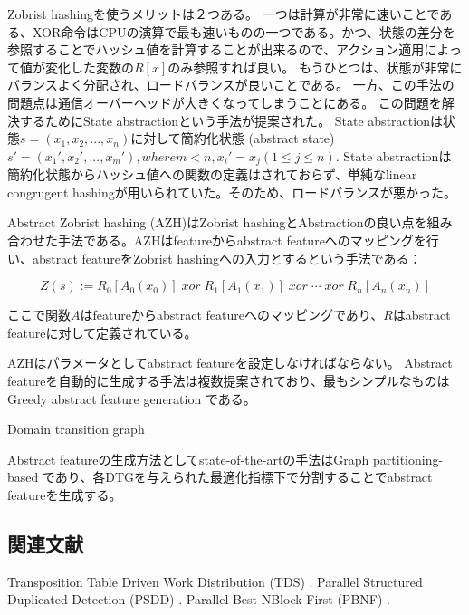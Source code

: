 \documentclass[10pt]{book}
\begin{document}
Zobrist hashingを使うメリットは２つある。
一つは計算が非常に速いことである、XOR命令はCPUの演算で最も速いものの一つである。かつ、状態の差分を参照することでハッシュ値を計算することが出来るので、アクション適用によって値が変化した変数の$R[x]$のみ参照すれば良い。
もうひとつは、状態が非常にバランスよく分配され、ロードバランスが良いことである。
一方、この手法の問題点は通信オーバーヘッドが大きくなってしまうことにある。
この問題を解決するためにState abstractionという手法が提案された\cite{burnslrz10}。
State abstractionは状態$s = (x_1,x_2,...,x_n)$に対して簡約化状態 (abstract state) $s' = (x_1',x_2',...,x_m'), where m < n, x_i' = x_j (1 \leq j \leq n)$. %
State abstractionは簡約化状態からハッシュ値への関数の定義はされておらず、単純なlinear congrugent hashingが用いられていた。そのため、ロードバランスが悪かった。

Abstract Zobrist hashing (AZH)はZobrist hashingとAbstractionの良い点を組み合わせた手法である\cite{jinnai2016structured}。AZHはfeatureからabstract featureへのマッピングを行い、abstract featureをZobrist hashingへの入力とするという手法である：

\begin{equation}
\label{eq:abstract-zobrist}
 	Z(s) := R_{0}[A_0(x_{0})]\; xor\; R_{1}[A_1(x_{1})]\; xor\; \cdots\; xor\; R_{n}[A_n(x_{n})]%
\end{equation}

ここで関数$A$はfeatureからabstract featureへのマッピングであり、$R$はabstract featureに対して定義されている。

AZHはパラメータとしてabstract featureを設定しなければならない。
Abstract featureを自動的に生成する手法は複数提案されており、最もシンプルなものはGreedy abstract feature generation \cite{jinnai2016automated}である。

Domain transition graph

Abstract featureの生成方法としてstate-of-the-artの手法はGraph partitioning-based \cite{jinnai2017work}であり、各DTGを与えられた最適化指標下で分割することでabstract featureを生成する。

\subsection{関連文献}
Transposition Table Driven Work Distribution (TDS) \cite{}.
Parallel Structured Duplicated Detection (PSDD) \cite{}.
Parallel Best-NBlock First (PBNF) \cite{}.
\end{document}
